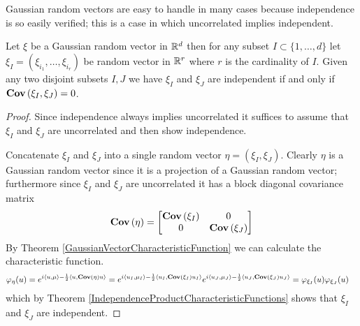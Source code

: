 Gaussian random vectors are easy to handle in many cases because
independence is so easily verified; this is a case in which
uncorrelated implies independent.
\begin{prop}\label{GaussianIndependence}Let $\xi$ be a Gaussian random
  vector in $\mathbb{R}^d$ then for any subset $I\subset \lbrace 1,
  \dotsc, d \rbrace$ let $\xi_I = (\xi_{i_1}, \dotsc, \xi_{i_r})$ be
  random vector in $\mathbb{R}^r$ where $r$ is the cardinality of $I$.
  Given any two disjoint subsets $I,J$ we have $\xi_I$ and $\xi_J$ are
  independent if and only if $\textbf{Cov} \left (\xi_I, \xi_J \right ) = 0$.  
\end{prop}
\begin{proof}
Since independence always implies uncorrelated it suffices to assume
that $\xi_I$ and $\xi_J$ are uncorrelated and then show independence.

Concatenate $\xi_I$ and $\xi_J$ into a single random vector $\eta=(\xi_I, \xi_J)$.
Clearly $\eta$ is a Gaussian random vector since it is a projection of
a Gaussian random vector; furthermore since $\xi_I$ and $\xi_J$ are
uncorrelated
it has a block diagonal covariance matrix 
\begin{align*}
\textbf{Cov} \left (\eta \right ) = \begin{bmatrix}
\textbf{Cov} \left (\xi_I \right ) & 0 \\
0 & \textbf{Cov} \left (\xi_J \right )
\end{bmatrix}
\end{align*}
By Theorem \ref{GaussianVectorCharacteristicFunction} we can calculate
the characteristic function.  
\begin{align*}
\varphi_\eta(u) &= 
e^{i\langle u, \mu \rangle - \frac{1}{2} \langle u, \textbf{Cov} \left (\eta \right ) u \rangle} 
=e^{i\langle u_I, \mu_I \rangle - \frac{1}{2} \langle u_I, \textbf{Cov} \left (\xi_I \right ) u_I \rangle} 
e^{i\langle u_J, \mu_J \rangle - \frac{1}{2} \langle u_J, \textbf{Cov} \left (\xi_J \right ) u_J \rangle} 
= \varphi_{\xi_I}(u) \varphi_{\xi_J}(u)
\end{align*}
which by Theorem \ref{IndependenceProductCharacteristicFunctions} shows that $\xi_I$ and $\xi_J$ are independent.
\end{proof}

